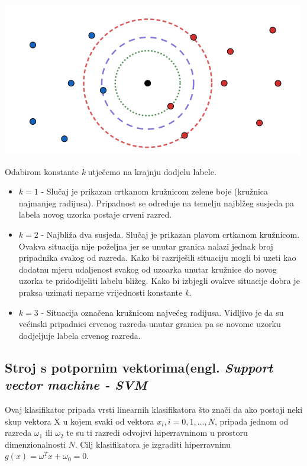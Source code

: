 \documentclass[times, utf8, zavrsni]{fer}
\begin{document}
\begin{minipage}{\linewidth}
\vspace{10pt}
\centering
\includegraphics[width=0.8\linewidth]{img/klas.png}
\end{minipage}

\bigbreak

Odabirom konstante \textit{k} utječemo na krajnju dodjelu labele.

\begin{itemize}
	\item \(k=1\) - Slučaj je prikazan crtkanom kružnicom zelene boje (kružnica najmanjeg 
	radijusa). Pripadnost se određuje na temelju najblžeg susjeda pa labela
	novog uzorka postaje crveni razred.
	\item \(k=2\) - Najbliža dva susjeda. Slučaj je prikazan plavom crtkanom kružnicom.
	Ovakva situacija nije poželjna jer se unutar granica nalazi jednak 
	broj pripadnika svakog od razreda. Kako bi razriješili situaciju mogli bi uzeti
	kao dodatnu mjeru udaljenost svakog od uzoarka unutar kružnice do novog uzorka te
	pridodijeliti labelu bližeg. Kako bi izbjegli ovakve situacije dobra je praksa 
	uzimati neparne vrijednosti konstante \textit{k}.
	\item \(k=3\) - Situacija označena kružnicom najvećeg radijusa. Vidljivo
	je da su većinski pripadnici crvenog razreda unutar granica pa se
	novome uzorku dodjeljuje labela crvenog razreda.
\end{itemize}

\newpage

\subsection{Stroj s potpornim vektorima(engl. \textit{Support vector machine - SVM}}

Ovaj klasifikator pripada vrsti linearnih klasifikatora što znači da 
ako postoji neki skup vektora X u kojem svaki od vektora \(x_i, i = 0, 1, ..., N\), 
pripada jednom od razreda \(\omega_1\) ili \(\omega_2\) te su ti razredi odvojivi hiperravninom 
u prostoru dimenzionalnosti \(N\). Cilj klasifikatora je izgraditi hiperravninu 
\(g(x) = \omega^Tx+\omega_0=0\).
\end{document}
